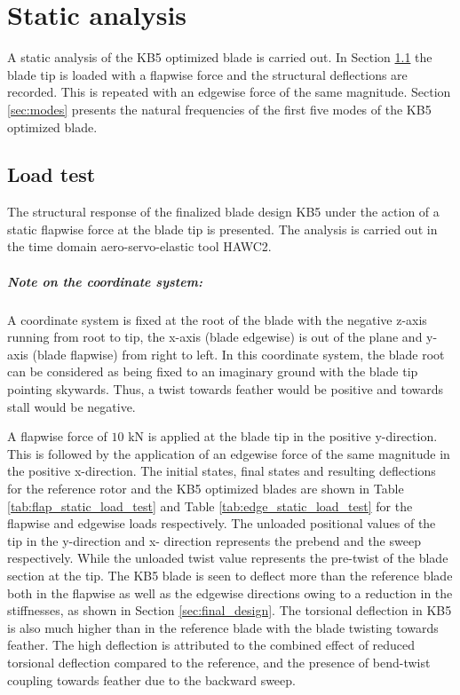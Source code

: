 \chapter{Static analysis}
\label{ch:load_test}
A static analysis of the KB5 optimized blade is carried out. In Section \ref{sec:load_test} the blade tip is loaded with a flapwise force and the structural deflections are recorded. This is repeated with an edgewise force of the same magnitude. Section \ref{sec:modes} presents the natural frequencies of the first five modes of the KB5 optimized blade. 
\section{Load test}
\label{sec:load_test}
The structural response of the finalized blade design KB5 under the action of a static flapwise force at the blade tip is presented. The analysis is carried out in the time domain aero-servo-elastic tool HAWC2. 
\paragraph{Note on the coordinate system:}
A coordinate system is fixed at the root of the blade with the negative z-axis running from root to tip, the x-axis (blade edgewise) is out of the plane and y-axis (blade flapwise) from right to left. In this coordinate system, the blade root can be considered as being fixed to an imaginary ground with the blade tip pointing skywards. Thus, a twist towards feather would be positive and towards stall would be negative.

A flapwise force of $10$ kN is applied at the blade tip in the positive y-direction. This is followed by the application of an edgewise force of the same magnitude in the positive x-direction. The initial states, final states and resulting deflections for the reference rotor and the KB5 optimized blades are shown in Table \ref{tab:flap_static_load_test} and Table \ref{tab:edge_static_load_test} for the flapwise and edgewise loads respectively. The unloaded positional values of the tip in the y-direction and x- direction represents the prebend and the sweep respectively. While the unloaded twist value represents the pre-twist of the blade section at the tip. The KB5 blade is seen to deflect more than the reference blade both in the flapwise as well as the edgewise directions owing to a reduction in the stiffnesses, as shown in Section \ref{sec:final_design}. The torsional deflection in KB5 is also much higher than in the reference blade with the blade twisting towards feather. The high deflection is attributed to the combined effect of reduced torsional deflection compared to the reference, and the presence of bend-twist coupling towards feather due to the backward sweep.

